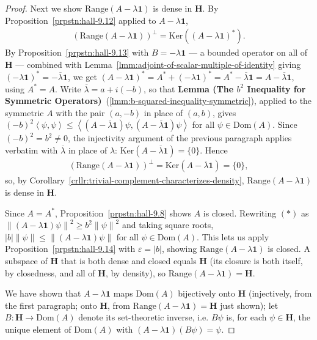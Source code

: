 \begin{proof}
Next we show $\text{Range}(A - \lambda \mathbf{1})$ is dense in $\mathbf{H}$. By Proposition~\ref{prpstn:hall-9.12} applied to $A - \lambda \mathbf{1}$,
\begin{align}
    \left( \text{Range}(A - \lambda \mathbf{1}) \right)^\perp = \text{Ker}\left( (A - \lambda \mathbf{1})^* \right).
\end{align}
By Proposition~\ref{prpstn:hall-9.13} with $B = -\lambda \mathbf{1}$ — a bounded operator on all of $\mathbf{H}$ — combined with Lemma~\ref{lmm:adjoint-of-scalar-multiple-of-identity} giving $(-\lambda\mathbf{1})^* = -\overline{\lambda}\mathbf{1}$, we get $(A - \lambda\mathbf{1})^* = A^* + (-\lambda\mathbf{1})^* = A^* - \overline{\lambda}\mathbf{1} = A - \overline{\lambda}\mathbf{1}$, using $A^* = A$. Write $\overline{\lambda} = a + i(-b)$, so that \textbf{Lemma (The $b^2$ Inequality for Symmetric Operators)}~(\ref{lmm:b-squared-inequality-symmetric}), applied to the symmetric $A$ with the pair $(a, -b)$ in place of $(a,b)$, gives $(-b)^2\left< \psi,\psi \right> \le \left< (A - \overline{\lambda}\mathbf{1})\psi, (A-\overline{\lambda}\mathbf{1})\psi \right>$ for all $\psi \in \text{Dom}(A)$. Since $(-b)^2 = b^2 \ne 0$, the injectivity argument of the previous paragraph applies verbatim with $\overline{\lambda}$ in place of $\lambda$: $\text{Ker}(A - \overline{\lambda}\mathbf{1}) = \{0\}$. Hence
\begin{align}
    \left( \text{Range}(A - \lambda \mathbf{1}) \right)^\perp = \text{Ker}(A - \overline{\lambda}\mathbf{1}) = \{0\},
\end{align}
so, by Corollary~\ref{crllr:trivial-complement-characterizes-density}, $\text{Range}(A - \lambda \mathbf{1})$ is dense in $\mathbf{H}$.

Since $A = A^*$, Proposition~\ref{prpstn:hall-9.8} shows $A$ is closed. Rewriting $(\ast)$ as $\left\| (A - \lambda\mathbf{1})\psi \right\|^2 \ge b^2 \left\| \psi \right\|^2$ and taking square roots, $\lvert b \rvert \left\| \psi \right\| \le \left\| (A-\lambda\mathbf{1})\psi \right\|$ for all $\psi \in \text{Dom}(A)$. This lets us apply Proposition~\ref{prpstn:hall-9.14} with $\varepsilon = \lvert b \rvert$, showing $\text{Range}(A - \lambda\mathbf{1})$ is closed. A subspace of $\mathbf{H}$ that is both dense and closed equals $\mathbf{H}$ (its closure is both itself, by closedness, and all of $\mathbf{H}$, by density), so $\text{Range}(A - \lambda\mathbf{1}) = \mathbf{H}$.

We have shown that $A - \lambda \mathbf{1}$ maps $\text{Dom}(A)$ bijectively onto $\mathbf{H}$ (injectively, from the first paragraph; onto $\mathbf{H}$, from $\text{Range}(A-\lambda\mathbf{1}) = \mathbf{H}$ just shown); let $B : \mathbf{H} \to \text{Dom}(A)$ denote its set-theoretic inverse, i.e. $B\psi$ is, for each $\psi \in \mathbf{H}$, the unique element of $\text{Dom}(A)$ with $(A-\lambda\mathbf{1})(B\psi) = \psi$.


\end{proof}
